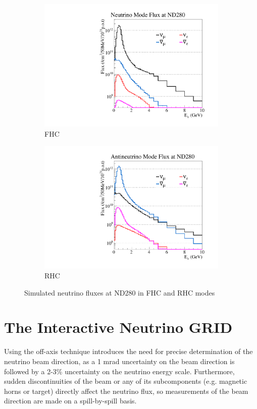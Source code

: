 \begin{figure}[h]
	\begin{subfigure}[t]{0.45\textwidth}
		\includegraphics[width=\textwidth, trim={0mm 0mm 0mm 0mm}, clip,page=1]{figures/det_chap/beam/nd5_alltunedflux_run1-8_zoomed_13a}
		\caption{FHC}
	\end{subfigure}
	\begin{subfigure}[t]{0.45\textwidth}
		\includegraphics[width=\textwidth, trim={0mm 0mm 0mm 0mm}, clip,page=1]{figures/det_chap/beam/nd5_alltunedflux_run5c-7b_zoomed_antinu_13a}
		\caption{RHC}
	\end{subfigure}
	\caption{Simulated neutrino fluxes at ND280 in FHC and RHC modes}
	\label{fig:flux_1to8}
\end{figure}

\section{The Interactive Neutrino GRID}
\label{sec:ingrid}
Using the off-axis technique introduces the need for precise determination of the neutrino beam direction, as a 1 mrad uncertainty on the beam direction is followed by a 2-3\% uncertainty on the neutrino energy scale\cite{t2k_det}. Furthermore, sudden discontinuities of the beam or any of its subcomponents (e.g. magnetic horns or target) directly affect the neutrino flux, so measurements of the beam direction are made on a spill-by-spill basis.

